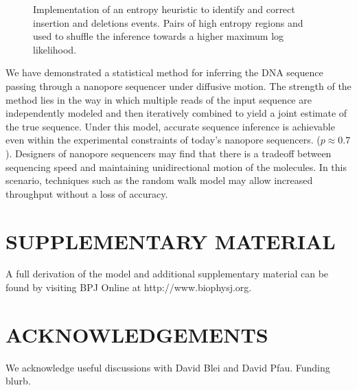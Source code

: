 \documentclass{biophys_letter}
\begin{document}
\begin{figure}
\caption{Implementation of an entropy heuristic to identify and correct insertion and deletions events. Pairs of high entropy regions and used to shuffle the inference towards a higher maximum log likelihood.}
\label{fig:entropy_restarts}
\end{figure}

We have demonstrated a statistical method for inferring the DNA sequence passing through a nanopore sequencer under diffusive motion.
The strength of the method lies in the way in which multiple reads of the input sequence are independently modeled and then iteratively combined to yield a joint estimate of the true sequence.
Under this model, accurate sequence inference is achievable even within the experimental constraints of today's nanopore sequencers. ($p \approx 0.7$).
Designers of nanopore sequencers may find that there is a tradeoff between sequencing speed and maintaining unidirectional motion of the molecules.
In this scenario, techniques such as the random walk model may allow increased throughput without a loss of accuracy.

\section*{SUPPLEMENTARY MATERIAL}

A full derivation of the model and additional supplementary material can be found by visiting BPJ Online at http://www.biophysj.org.\vspace*{6pt}

\section*{ACKNOWLEDGEMENTS}

We acknowledge useful discussions with David Blei and David Pfau. Funding blurb.
\end{document}
